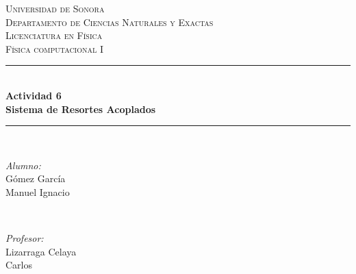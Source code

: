 \begin{titlepage}

\newcommand{\HRule}{\rule{\linewidth}{0.5mm}} %

\center %
 

\textsc{\LARGE Universidad de Sonora }\\[0.3cm] %
\textsc{\Large Departamento de Ciencias Naturales y Exactas  }\\[0.3cm]
\textsc{\Large Licenciatura en Física }\\[0.3cm]
\textsc{\Large Física computacional I}\\[0.3cm] %


\HRule \\[0.1cm]
{ \huge \bfseries Actividad 6\\  Sistema de Resortes Acoplados}\\[0.01cm] %
\HRule \\[1.5cm]

 

\begin{minipage}{0.4\textwidth}
\begin{flushleft} \large
\emph{Alumno:}\\
Gómez García \\Manuel Ignacio\\ %
\end{flushleft}
\end{minipage}
~
\begin{minipage}{0.4\textwidth}
\begin{flushright} \large
\emph{Profesor:} \\
Lizarraga Celaya\\Carlos\\%
\end{flushright}
\end{minipage}\\[1cm]


\end{titlepage}
